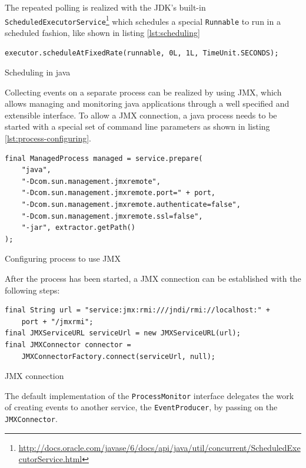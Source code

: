 The repeated polling is realized with the JDK's built-in \\ \texttt{ScheduledExecutorService}\footnote{\url{http://docs.oracle.com/javase/6/docs/api/java/util/concurrent/ScheduledExecutorService.html}} which schedules a special \texttt{Runnable} to run in a scheduled fashion, like shown in listing \ref{lst:scheduling}

\begin{listing}[H]
\begin{verbatim}
executor.scheduleAtFixedRate(runnable, 0L, 1L, TimeUnit.SECONDS);
\end{verbatim}
\caption{Scheduling in java}
\label{lst:scheduling}
\end{listing}

\newpage
Collecting events on a separate process can be realized by using \gls{JMX}, which allows managing and monitoring java applications through a well specified and extensible interface. To allow a \gls{JMX} connection, a java process needs to be started with a special set of command line parameters as shown in listing \ref{lst:process-configuring}.

\begin{listing}[H]
\begin{verbatim}
final ManagedProcess managed = service.prepare(
    "java",
    "-Dcom.sun.management.jmxremote",
    "-Dcom.sun.management.jmxremote.port=" + port,
    "-Dcom.sun.management.jmxremote.authenticate=false",
    "-Dcom.sun.management.jmxremote.ssl=false",
    "-jar", extractor.getPath()
);
\end{verbatim}
\caption{Configuring process to use JMX}
\label{lst:process-configuring}
\end{listing}

After the process has been started, a \gls{JMX} connection can be established with the following steps:

\begin{listing}[H]
\begin{verbatim}
final String url = "service:jmx:rmi:///jndi/rmi://localhost:" + 
    port + "/jmxrmi";
final JMXServiceURL serviceUrl = new JMXServiceURL(url);
final JMXConnector connector = 
    JMXConnectorFactory.connect(serviceUrl, null);
\end{verbatim}
\caption{JMX connection}
\label{lst:jmx}
\end{listing}

The default implementation of the \texttt{ProcessMonitor} interface delegates the work of creating events to another service, the \texttt{EventProducer}, by passing on the \texttt{JMXConnector}.

